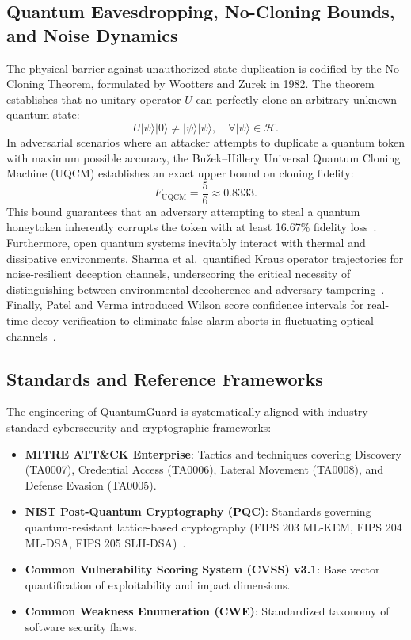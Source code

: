 \documentclass[journal,10pt]{IEEEtran}
\begin{document}
\subsection{Quantum Eavesdropping, No-Cloning Bounds, and Noise Dynamics}
The physical barrier against unauthorized state duplication is codified by the No-Cloning Theorem, formulated by Wootters and Zurek in 1982. The theorem establishes that no unitary operator $U$ can perfectly clone an arbitrary unknown quantum state:
\begin{equation}
  U|\psi\rangle|0\rangle \ne |\psi\rangle|\psi\rangle, \quad \forall |\psi\rangle \in \mathcal{H}.
\end{equation}
In adversarial scenarios where an attacker attempts to duplicate a quantum token with maximum possible accuracy, the Bu\v{z}ek--Hillery Universal Quantum Cloning Machine (UQCM) establishes an exact upper bound on cloning fidelity:
\begin{equation}
  F_{\mathrm{UQCM}} = \frac{5}{6} \approx 0.8333.
\end{equation}
This bound guarantees that an adversary attempting to steal a quantum honeytoken inherently corrupts the token with at least 16.67\% fidelity loss~\cite{li2024universal}. Furthermore, open quantum systems inevitably interact with thermal and dissipative environments. Sharma et al.\ quantified Kraus operator trajectories for noise-resilient deception channels, underscoring the critical necessity of distinguishing between environmental decoherence and adversary tampering~\cite{sharma2024noise}. Finally, Patel and Verma introduced Wilson score confidence intervals for real-time decoy verification to eliminate false-alarm aborts in fluctuating optical channels~\cite{patel2024wilson}.

\subsection{Standards and Reference Frameworks}
The engineering of QuantumGuard is systematically aligned with industry-standard cybersecurity and cryptographic frameworks:
\begin{itemize}
    \item \textbf{MITRE ATT\&CK Enterprise}: Tactics and techniques covering Discovery (TA0007), Credential Access (TA0006), Lateral Movement (TA0008), and Defense Evasion (TA0005).
    \item \textbf{NIST Post-Quantum Cryptography (PQC)}: Standards governing quantum-resistant lattice-based cryptography (FIPS 203 ML-KEM, FIPS 204 ML-DSA, FIPS 205 SLH-DSA)~\cite{nist2024pqc}.
    \item \textbf{Common Vulnerability Scoring System (CVSS) v3.1}: Base vector quantification of exploitability and impact dimensions.
    \item \textbf{Common Weakness Enumeration (CWE)}: Standardized taxonomy of software security flaws.
\end{itemize}
\end{document}
